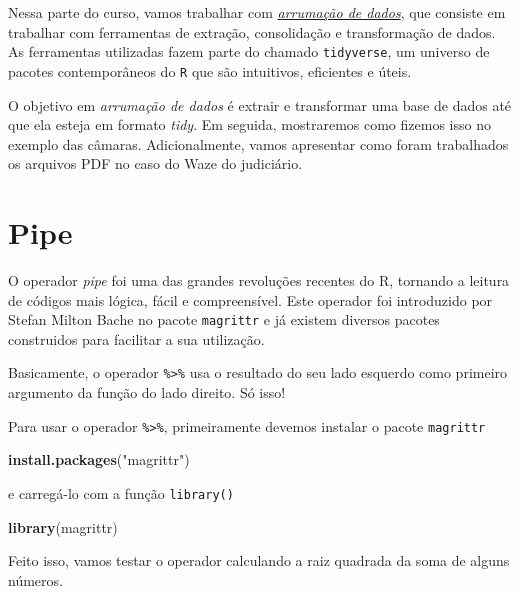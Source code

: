 \documentclass[]{book}
\newenvironment{Shaded}{\begin{snugshade}}{\end{snugshade}}
\newcommand{\KeywordTok}[1]{\textcolor[rgb]{0.13,0.29,0.53}{\textbf{{#1}}}}
\newcommand{\DecValTok}[1]{\textcolor[rgb]{0.00,0.00,0.81}{{#1}}}
\newcommand{\StringTok}[1]{\textcolor[rgb]{0.31,0.60,0.02}{{#1}}}
\newcommand{\NormalTok}[1]{{#1}}
\begin{document}
Nessa parte do curso, vamos trabalhar com
\href{http://r4ds.had.co.nz/wrangle-intro.html}{\emph{arrumação de
dados}}, que consiste em trabalhar com ferramentas de extração,
consolidação e transformação de dados. As ferramentas utilizadas fazem
parte do chamado \texttt{tidyverse}, um universo de pacotes
contemporâneos do \texttt{R} que são intuitivos, eficientes e úteis.

O objetivo em \emph{arrumação de dados} é extrair e transformar uma base
de dados até que ela esteja em formato \emph{tidy}. Em seguida,
mostraremos como fizemos isso no exemplo das câmaras. Adicionalmente,
vamos apresentar como foram trabalhados os arquivos PDF no caso do Waze
do judiciário.

\section{Pipe}\label{pipe}

O operador \emph{pipe} foi uma das grandes revoluções recentes do R,
tornando a leitura de códigos mais lógica, fácil e compreensível. Este
operador foi introduzido por Stefan Milton Bache no pacote
\texttt{magrittr} e já existem diversos pacotes construidos para
facilitar a sua utilização.

Basicamente, o operador \texttt{\%\textgreater{}\%} usa o resultado do
seu lado esquerdo como primeiro argumento da função do lado direito. Só
isso!

Para usar o operador \texttt{\%\textgreater{}\%}, primeiramente devemos
instalar o pacote \texttt{magrittr}

\begin{Shaded}
\begin{Highlighting}[]
\KeywordTok{install.packages}\NormalTok{(}\StringTok{"magrittr"}\NormalTok{)}
\end{Highlighting}
\end{Shaded}

e carregá-lo com a função \texttt{library()}

\begin{Shaded}
\begin{Highlighting}[]
\KeywordTok{library}\NormalTok{(magrittr)}
\end{Highlighting}
\end{Shaded}

Feito isso, vamos testar o operador calculando a raiz quadrada da soma
de alguns números.

\begin{Shaded}
\end{Shaded}
\end{document}
